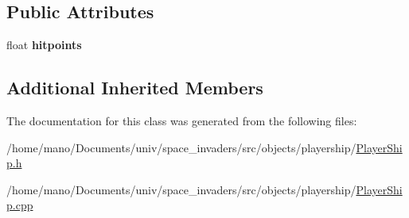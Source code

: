 \subsection*{Public Attributes}
\begin{DoxyCompactItemize}
\item 
\mbox{\label{classobjects_1_1playership_1_1PlayerShip_ab9cf9712f43739b1ba9d6b83ae45fd4c}}
float {\bfseries hitpoints}
\end{DoxyCompactItemize}
\subsection*{Additional Inherited Members}


The documentation for this class was generated from the following files\+:\begin{DoxyCompactItemize}
\item 
/home/mano/\+Documents/univ/space\+\_\+invaders/src/objects/playership/\hyperlink{PlayerShip_8h}{Player\+Ship.\+h}\item
/home/mano/\+Documents/univ/space\+\_\+invaders/src/objects/playership/\hyperlink{PlayerShip_8cpp}{Player\+Ship.\+cpp}\end{DoxyCompactItemize}
